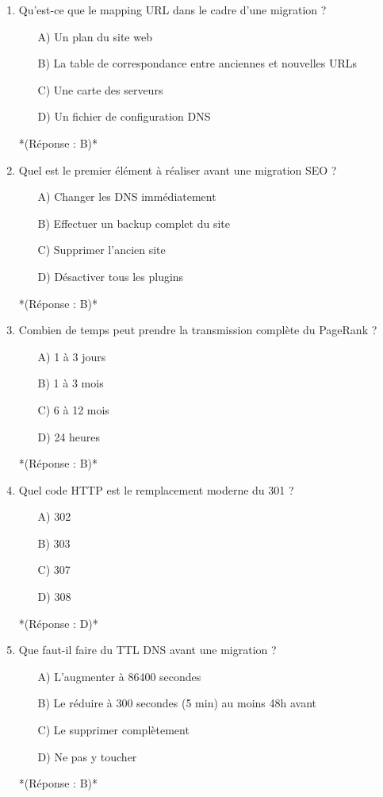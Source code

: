 \documentclass[12pt,a4paper,twoside]{report}
\begin{document}
\begin{enumerate}
\item Qu'est-ce que le mapping URL dans le cadre d'une migration ?
\begin{itemize}
\item[A)] Un plan du site web
\item[B)] La table de correspondance entre anciennes et nouvelles URLs
\item[C)] Une carte des serveurs
\item[D)] Un fichier de configuration DNS
\end{itemize}
*(Réponse : B)*

\item Quel est le premier élément à réaliser avant une migration SEO ?
\begin{itemize}
\item[A)] Changer les DNS immédiatement
\item[B)] Effectuer un backup complet du site
\item[C)] Supprimer l'ancien site
\item[D)] Désactiver tous les plugins
\end{itemize}
*(Réponse : B)*

\item Combien de temps peut prendre la transmission complète du PageRank ?
\begin{itemize}
\item[A)] 1 à 3 jours
\item[B)] 1 à 3 mois
\item[C)] 6 à 12 mois
\item[D)] 24 heures
\end{itemize}
*(Réponse : B)*

\item Quel code HTTP est le remplacement moderne du 301 ?
\begin{itemize}
\item[A)] 302
\item[B)] 303
\item[C)] 307
\item[D)] 308
\end{itemize}
*(Réponse : D)*

\item Que faut-il faire du TTL DNS avant une migration ?
\begin{itemize}
\item[A)] L'augmenter à 86400 secondes
\item[B)] Le réduire à 300 secondes (5 min) au moins 48h avant
\item[C)] Le supprimer complètement
\item[D)] Ne pas y toucher
\end{itemize}
*(Réponse : B)*


\end{enumerate}
\end{document}
